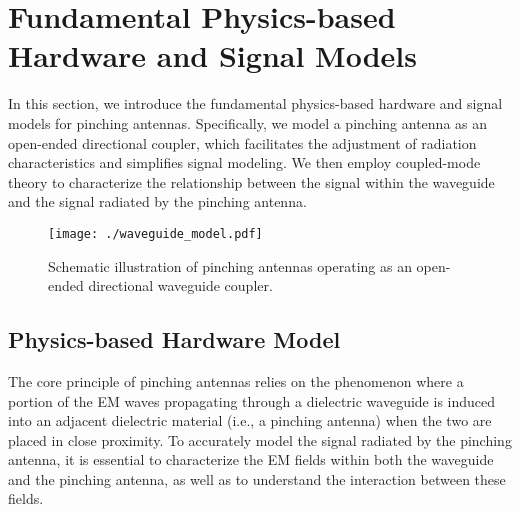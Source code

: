 \section{Fundamental Physics-based Hardware and Signal Models} \label{sec:model}

In this section, we introduce the fundamental physics-based hardware and signal models for pinching antennas. Specifically, we model a pinching antenna as an open-ended directional coupler, which facilitates the adjustment of radiation characteristics and simplifies signal modeling. We then employ coupled-mode theory to characterize the relationship between the signal within the waveguide and the signal radiated by the pinching antenna.

\begin{figure}[t!]
    \centering
    \texttt{[image: ./waveguide\_model.pdf]}
    \caption{Schematic illustration of pinching antennas operating as an open-ended directional waveguide coupler.}
    \label{physical_model}
  \end{figure} 

\subsection{Physics-based Hardware Model}

The core principle of pinching antennas relies on the phenomenon where a portion of the EM waves propagating through a dielectric waveguide is induced into an adjacent dielectric material (i.e., a pinching antenna) when the two are placed in close proximity. To accurately model the signal radiated by the pinching antenna, it is essential to characterize the EM fields within both the waveguide and the pinching antenna, as well as to understand the interaction between these fields. 

